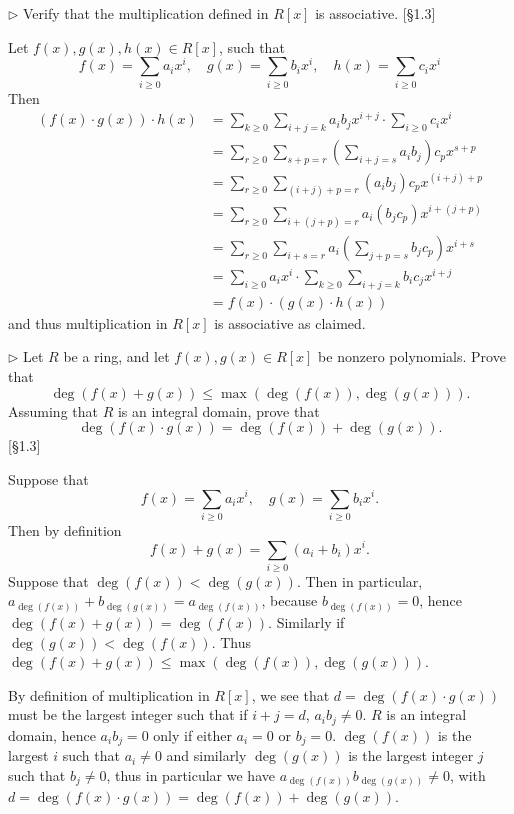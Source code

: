 \begin{problem}
	$\triangleright$ Verify that the multiplication defined in $R[x]$ is associative. [\S 1.3]
\end{problem}

\begin{solution}
	Let $f(x), g(x), h(x) \in R[x]$, such that
	\[
		f(x) = \sum_{i \geq 0} a_i x^i, \quad g(x) = \sum_{i \geq 0} b_i x^i, \quad h(x) = \sum_{i \geq 0} c_i x^i
	\]
	Then
	\begin{align*}
		(f(x) \cdot g(x)) \cdot h(x) &= \sum_{k \geq 0} \sum_{i+j=k} a_i b_j x^{i+j} \cdot \sum_{i \geq 0} c_i x^i\\
		&= \sum_{r \geq 0} \sum_{s+p=r} (\sum_{i+j = s} a_i b_j) c_p x^{s+p} \\
		&= \sum_{r \geq 0} \sum_{(i+j)+p=r} (a_i b_j) c_p x^{(i+j)+p} \\
		&= \sum_{r \geq 0} \sum_{i+(j+p)=r} a_i (b_j c_p) x^{i+(j+p)} \\
		&= \sum_{r \geq 0} \sum_{i+s=r} a_i (\sum_{j+p=s} b_j c_p) x^{i+s} \\
		&= \sum_{i \geq 0} a_i x^i \cdot \sum_{k \geq 0} \sum_{i+j=k} b_i c_j x^{i+j} \\
		&= f(x) \cdot (g(x) \cdot h(x))
	\end{align*}
	and thus multiplication in $R[x]$ is associative as claimed.
\end{solution}

\begin{problem}
	$\triangleright$ Let $R$ be a ring, and let $f(x), g(x) \in R[x]$ be nonzero polynomials. Prove that
	\[
		\deg(f(x) + g(x)) \leq \max(\deg(f(x)), \deg(g(x))) \text{.}
	\]
	Assuming that $R$ is an integral domain, prove that
	\[
		\deg(f(x) \cdot g(x)) = \deg(f(x)) + \deg(g(x)) \text{.}
	\]
	[\S 1.3]
\end{problem}

\begin{solution}
	Suppose that
	\[
		f(x) = \sum_{i \geq 0} a_i x^i, \quad g(x) = \sum_{i \geq 0} b_i x^i \text{.}
	\]
	Then by definition
	\[
		f(x) + g(x) = \sum_{i \geq 0}(a_i + b_i) x^i \text{.}
	\]
	Suppose that $\deg(f(x)) < \deg(g(x))$. Then in particular, $a_{\deg(f(x))} + b_{\deg(g(x))} = a_{\deg(f(x))}$, because $b_{\deg(f(x))} = 0$, hence $\deg(f(x) + g(x)) = \deg(f(x))$. Similarly if $\deg(g(x)) < \deg(f(x))$. Thus $\deg(f(x) + g(x)) \leq \max(\deg(f(x)), \deg(g(x)))$.
	
	By definition of multiplication in $R[x]$, we see that $d = \deg(f(x) \cdot g(x))$ must be the largest integer such that if $i + j = d$, $a_i b_j \neq 0$. $R$ is an integral domain, hence $a_i b_j = 0$ only if either $a_i = 0$ or $b_j = 0$. $\deg(f(x))$ is the largest $i$ such that $a_i \neq 0$ and similarly $\deg(g(x))$ is the largest integer $j$ such that $b_j \neq 0$, thus in particular we have $a_{\deg(f(x))} b_{\deg(g(x))} \neq 0$, with $d = \deg(f(x) \cdot g(x)) = \deg(f(x)) + \deg(g(x))$.
\end{solution}

